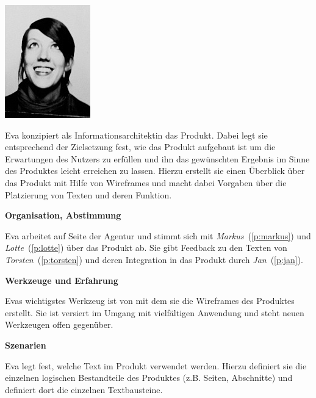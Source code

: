 \begin{multicols}{2}

\begin{center}
\includegraphics[width=0.5\columnwidth]{media/eva.jpg}
\end{center}


Eva konzipiert als Informationsarchitektin das Produkt. Dabei legt sie entsprechend der Zielsetzung fest, wie das Produkt aufgebaut ist um die Erwartungen des Nutzers zu erfüllen und ihn das gewünschten Ergebnis im Sinne des Produktes leicht erreichen zu lassen. Hierzu erstellt sie einen Überblick über das Produkt mit Hilfe von Wireframes und macht dabei Vorgaben über die Platzierung von Texten und deren Funktion.

\textbf{Organisation, Abstimmung}

Eva arbeitet auf Seite der Agentur und stimmt sich mit \emph{Markus}~(\ref{p:markus}) und \emph{Lotte}~(\ref{p:lotte}) über das Produkt ab. Sie gibt Feedback zu den Texten von \emph{Torsten}~(\ref{p:torsten}) und deren Integration in das Produkt durch \emph{Jan}~(\ref{p:jan}).

\textbf{Werkzeuge und Erfahrung}

Evas wichtigstes Werkzeug ist  von  mit dem sie die Wireframes des Produktes erstellt. Sie ist versiert im Umgang mit vielfältigen Anwendung und steht neuen Werkzeugen offen gegenüber.

\columnbreak

\textbf{Szenarien}

Eva legt fest, welche Text im Produkt verwendet werden. Hierzu definiert sie die einzelnen logischen Bestandteile des Produktes (z.B. Seiten, Abschnitte) und definiert dort die einzelnen Textbausteine.


\end{multicols}
